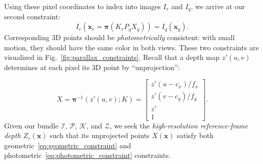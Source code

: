 \noindent Using these pixel coordinates to index into images $I_r$ and $I_q$, we arrive at our second constraint:
\begin{equation}\label{eq:photometric_constraint}
    I_r(\bm{x}_r = \bm{\pi}(K_r P_q X_q)) = I_q(\bm{x}_q).
\end{equation}
Corresponding 3D points should be \emph{photometrically} consistent: with small motion, they should have the same color in both views. These two constraints are visualized in Fig.~\ref{fig:parallax_constraints}. Recall that a depth map $z'(u,v)$ determines at each pixel its 3D point by ``unprojection'':

\begin{equation}\label{eq:forward_model}
X = \bm{\pi}^{-1}(z'(u,v);K)
=
\left[\begin{array}{c}
z'(u-c_x) / f_x \\
z'(v-c_y) / f_y \\
z' \\
1
\end{array}\right].
\end{equation}
Given our bundle $\mathcal{I}$, $\mathcal{P}$, $\mathcal{K}$, and $\mathcal{Z}$, we seek the \emph{high-resolution reference-frame depth $Z_r(\bm{x})$} such that its unprojected points $X(\bm{x})$ satisfy both geometric~\eqref{eq:geometric_constraint} and photometric~\eqref{eq:photometric_constraint} constraints.


